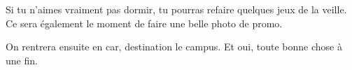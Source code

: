 Si tu n'aimes vraiment pas dormir, tu pourras refaire quelques jeux de la veille. Ce sera également le moment de faire une belle photo de promo.

On rentrera ensuite en car, destination le campus. Et oui, toute bonne chose à une fin.

